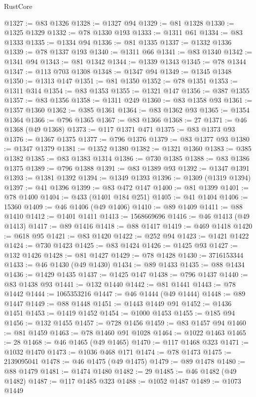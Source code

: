 \begin{lexlean}{RustCore}
\begin{coremodule}
@1327 := @83 @1326
@1328 := @1327 @94
@1329 := @81 @1328
@1330 := @1325 @1329
@1332 := @78 @1330 @193
@1333 := @1311 @61
@1334 := @83 @1333
@1335 := @1334 @94
@1336 := @81 @1335
@1337 := @1332 @1336
@1339 := @78 @1337 @193
@1340 := @1311 @66
@1341 := @83 @1340
@1342 := @1341 @94
@1343 := @81 @1342
@1344 := @1339 @1343
@1345 := @78 @1344
@1347 := @113 @703 @1308
@1348 := @1347 @94
@1349 := @1345 @1348
@1350 := @1313 @147
@1351 := @81 @1350
@1352 := @78 @1351
@1353 := @1311 @314
@1354 := @83 @1353
@1355 := @1321 @147
@1356 := @387 @1355
@1357 := @83 @1356
@1358 := @1311 @249
@1360 := @83 @1358 @93
@1361 := @1357 @1360
@1362 := @385 @1361
@1364 := @83 @1362 @93
@1365 := @1354 @1364
@1366 := @796 @1365
@1367 := @83 @1366
@1368 := 27
@1371 := @46 @1368 (@49 @1368)
@1373 := @117 @1371 @471
@1375 := @83 @1373 @93
@1376 := @1367 @1375
@1377 := @796 @1376
@1379 := @83 @1377 @93
@1380 := @1347 @1379
@1381 := @1352 @1380
@1382 := @1321 @1360
@1383 := @385 @1382
@1385 := @83 @1383 @1314
@1386 := @730 @1385
@1388 := @83 @1386 @1375
@1389 := @796 @1388
@1391 := @83 @1389 @93
@1392 := @1347 @1391
@1393 := @1381 @1392
@1394 := @1349 @1393
@1396 := @1309 (@1319 @1394)
@1397 := @41 @1396
@1399 := @83 @472 @147
@1400 := @81 @1399
@1401 := @78 @1400
@1404 := @433 (@1401 @184 @251)
@1405 := @41 @1404
@1406 := 15360
@1409 := @46 @1406 (@49 @1406)
@1410 := @89 @1409
@1411 := @88 @1410
@1412 := @1401 @1411
@1413 := 1568669696
@1416 := @46 @1413 (@49 @1413)
@1417 := @89 @1416
@1418 := @88 @1417
@1419 := @469 @1418
@1420 := @618 @95
@1421 := @83 @1420
@1422 := @252 @94
@1423 := @1421 @1422
@1424 := @730 @1423
@1425 := @83 @1424
@1426 := @1425 @93
@1427 := @132 @1426
@1428 := @81 @1427
@1429 := @78 @1428
@1430 := 3716153344
@1433 := @46 @1430 (@49 @1430)
@1434 := @89 @1433
@1435 := @88 @1434
@1436 := @1429 @1435
@1437 := @1425 @147
@1438 := @796 @1437
@1440 := @83 @1438 @93
@1441 := @132 @1440
@1442 := @81 @1441
@1443 := @78 @1442
@1444 := 1065353216
@1447 := @46 @1444 (@49 @1444)
@1448 := @89 @1447
@1449 := @88 @1448
@1451 := @1443 @1449 @91
@1452 := @1436 @1451
@1453 := @1419 @1452
@1454 := @1000 @1453
@1455 := @185 @94
@1456 := @132 @1455
@1457 := @728 @1456
@1459 := @83 @1457 @94
@1460 := @81 @1459
@1463 := @78 @1460 @91 @1028
@1464 := @1022 @1463
@1465 := 28
@1468 := @46 @1465 (@49 @1465)
@1470 := @117 @1468 @323
@1471 := @1032 @1470
@1473 := @1036 @468 @171
@1474 := @78 @1473
@1475 := 2139095041
@1478 := @46 @1475 (@49 @1475)
@1479 := @89 @1478
@1480 := @88 @1479
@1481 := @1474 @1480
@1482 := 29
@1485 := @46 @1482 (@49 @1482)
@1487 := @117 @1485 @323
@1488 := @1052 @1487
@1489 := @1073 @1449

\end{coremodule}
\end{lexlean}
